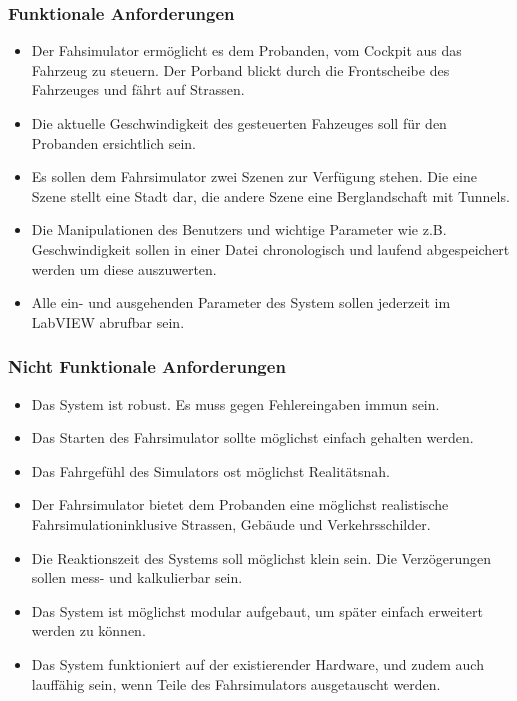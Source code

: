 \subsubsection{Funktionale Anforderungen}
\begin{itemize}
\item Der Fahsimulator ermöglicht es dem Probanden, vom Cockpit aus das Fahrzeug zu steuern. Der Porband blickt durch die Frontscheibe des Fahrzeuges und fährt auf Strassen.
\item Die aktuelle Geschwindigkeit des gesteuerten Fahzeuges soll für den Probanden ersichtlich sein. 
\item Es sollen dem Fahrsimulator zwei Szenen zur Verfügung stehen. Die eine Szene stellt eine Stadt dar, die andere Szene eine Berglandschaft mit Tunnels.
\item Die Manipulationen des Benutzers und wichtige Parameter wie z.B. Geschwindigkeit sollen in einer Datei chronologisch und laufend abgespeichert werden um diese auszuwerten.
\item Alle ein- und ausgehenden Parameter des System sollen jederzeit im LabVIEW abrufbar sein.
\end{itemize}

\subsubsection {Nicht Funktionale Anforderungen}
\renewcommand{\labelenumi}{\alph{enumi})}

\begin{itemize}
\item Das System ist robust. Es muss gegen Fehlereingaben immun sein. 
\item Das Starten des Fahrsimulator sollte möglichst einfach gehalten werden.
\item Das Fahrgefühl des Simulators ost möglichst Realitätsnah.  
\item Der Fahrsimulator bietet dem Probanden eine möglichst realistische Fahrsimulationinklusive Strassen, Gebäude und Verkehrsschilder. 
\item Die Reaktionszeit des Systems soll möglichst klein sein. Die Verzögerungen sollen mess-  und kalkulierbar sein.
\item Das System ist möglichst modular aufgebaut, um später einfach erweitert werden zu können.
\item Das System funktioniert auf der existierender Hardware, und zudem auch lauffähig sein, wenn Teile des Fahrsimulators ausgetauscht werden. 
\end{itemize}
